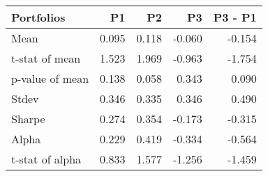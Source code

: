 \begin{tabular}{lrrrr}
\toprule
Portfolios & P1 & P2 & P3 & P3 - P1 \\
\midrule
Mean & 0.095 & 0.118 & -0.060 & -0.154 \\
t-stat of mean & 1.523 & 1.969 & -0.963 & -1.754 \\
p-value of mean & 0.138 & 0.058 & 0.343 & 0.090 \\
Stdev & 0.346 & 0.335 & 0.346 & 0.490 \\
Sharpe & 0.274 & 0.354 & -0.173 & -0.315 \\
Alpha & 0.229 & 0.419 & -0.334 & -0.564 \\
t-stat of alpha & 0.833 & 1.577 & -1.256 & -1.459 \\
\bottomrule
\end{tabular}
